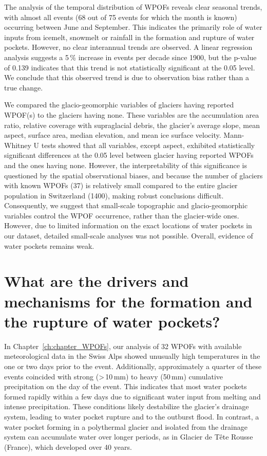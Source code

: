 The analysis of the temporal distribution of WPOFs reveals clear seasonal trends, with almost all events (68 out of 75 events for which the month is known) occurring between June and September. This indicates the primarily role of water inputs from icemelt, snowmelt or rainfall in the formation and rupture of water pockets. However, no clear interannual trends are observed. A linear regression analysis suggests a 5\,\% increase in events per decade since 1900, but the p-value of 0.139 indicates that this trend is not statistically significant at the 0.05 level. We conclude that this observed trend is due to observation bias rather than a true change.
%

We compared the glacio-geomorphic variables of glaciers having reported WPOF(s) to the glaciers having none. These variables are the accumulation area ratio, relative coverage with supraglacial debris, the glacier's average slope, mean aspect, surface area, median elevation, and mean ice surface velocity. Mann-Whitney U tests showed that all variables, except aspect, exhibited statistically significant differences at the 0.05 level between glacier having reported WPOFs and the ones having none. However, the interpretability of this significance is questioned by the spatial observational biases, and because the number of glaciers with known WPOFs (37) is relatively small compared to the entire glacier population in Switzerland (1400), making robust conclusions difficult. Consequently, we suggest that small-scale topographic and glacio-geomorphic variables control the WPOF occurrence, rather than the glacier-wide ones. However, due to limited information on the exact locations of water pockets in our dataset, detailed small-scale analyses was not possible. Overall, evidence of water pockets remains weak.
%


\section{What are the drivers and mechanisms for the formation and the rupture of water pockets?}

In Chapter~\ref{ch:chapter_WPOFs}, our analysis of 32 WPOFs with available meteorological data in the Swiss Alps showed unusually high temperatures in the one or two days prior to the event. Additionally, approximately a quarter of these events coincided with strong (>\,10\,mm) to heavy (50\,mm) cumulative precipitation on the day of the event. This indicates that most water pockets formed rapidly within a few days due to significant water input from melting and intense precipitation. These conditions likely destabilize the glacier's drainage system, leading to water pocket rupture and to the outburst flood. In contrast, a water pocket forming in a polythermal glacier and isolated from the drainage system can accumulate water over longer periods, as in Glacier de Tête Rousse (France), which developed over 40 years.  
%

